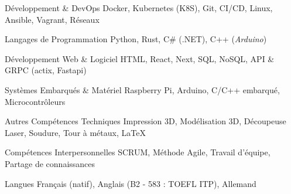 

\begin{cvskills}

	\cvskill
    {Développement \& DevOps} %
    {Docker, Kubernetes (K8S), Git, CI/CD, Linux, Ansible, Vagrant, Réseaux} %

	\cvskill
	{Langages de Programmation} %
    {Python, Rust, C\# (.NET), C++ (\textit{Arduino})} %

    \cvskill
    {Développement Web \& Logiciel} %
    {HTML, React, Next, SQL, NoSQL, API \& GRPC (actix, Fastapi)} %

    \cvskill
    {Systèmes Embarqués \& Matériel} %
    {Raspberry Pi, Arduino, C/C++ embarqué, Microcontrôleurs} %

	\cvskill
	{Autres Compétences Techniques} %
    {Impression 3D, Modélisation 3D, Découpeuse Laser, Soudure, Tour à métaux, LaTeX} %

	\cvskill
	{Compétences Interpersonnelles} %
	{SCRUM, Méthode Agile, Travail d'équipe, Partage de connaissances} %

	\cvskill
	{Langues} %
	{Français (natif), Anglais (B2 - 583 : TOEFL ITP), Allemand} %

\end{cvskills}
